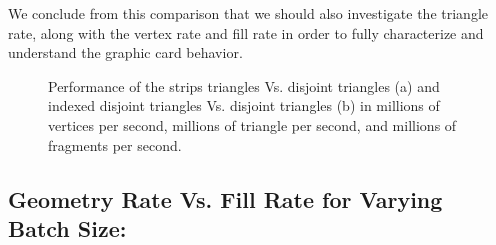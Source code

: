 We conclude from this comparison that we should also investigate the triangle rate, along with the vertex rate and fill rate in order to fully characterize and understand the graphic card behavior.
\begin{figure}[!tbh]
 \centering  
  \caption{Performance of the strips triangles Vs. disjoint triangles (a) and indexed disjoint triangles Vs. disjoint triangles (b) in millions of vertices per second, millions of triangle per second, and millions of fragments per second. }
   \label{fig:fill_geo3}
\end{figure} 


\subsection{Geometry Rate Vs. Fill Rate for Varying Batch Size:}

